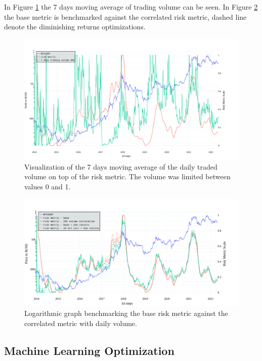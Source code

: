 In Figure \ref{figure-24volume-7sma} the 7 days moving average of trading volume can be seen. In Figure \ref{figure-24volume-riskmetric} the base metric is benchmarked against the correlated risk metric, dashed line denote the diminishing returns optimizations.

\begin{figure}[!hbt]
    \centering
    \includegraphics[width=\columnwidth]{figures/24volume-7sma.pdf}
    \caption{Visualization of the 7 days moving average of the daily traded volume on top of the risk metric. The volume was limited between values 0 and 1.}
    \label{figure-24volume-7sma}
\end{figure}

\begin{figure}[!hbt]
    \centering
    \includegraphics[width=\columnwidth]{figures/24volume-riskmetric.pdf}
    \caption{Logarithmic graph benchmarking the base risk metric against the correlated metric with daily volume.}
    \label{figure-24volume-riskmetric}
\end{figure}


\subsection*{Machine Learning Optimization}
\label{subsection-ml-optimization}


